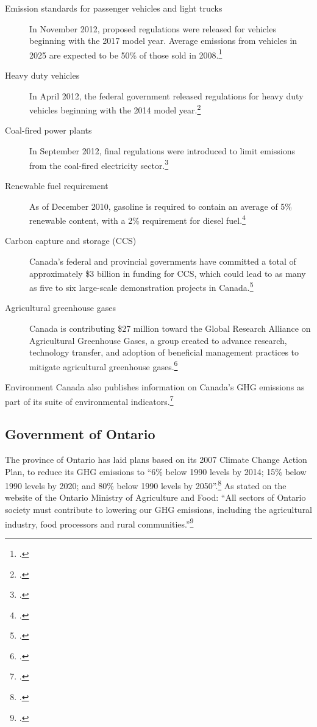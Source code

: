 \begin{description}
	\item[Emission standards for passenger vehicles and light trucks] In November 2012, proposed regulations were released for vehicles beginning with the 2017 model year. 
	Average emissions from vehicles in 2025 are expected to be 50\% of those sold in 2008.\footcite[][]{ECReducing}
	\item[Heavy duty vehicles] In April 2012, the federal government released regulations for heavy duty vehicles beginning with the 2014 model year.\footcite[][]{ECReducing}
	\item[Coal-fired power plants] In September 2012, final regulations were introduced to limit emissions from the coal-fired electricity sector.\footcite[][]{ECCoalFired}
	\item[Renewable fuel requirement] As of December 2010, gasoline is required to contain an average of 5\% renewable content, with a 2\% requirement for diesel fuel.\footcite[][]{ECReducing}
	\item[Carbon capture and storage (CCS)] Canada's federal and provincial governments have committed a total of approximately \$3 billion in funding for CCS, which could lead to as many as five to six large-scale demonstration projects in Canada.\footcite[][]{ECReducing}
	\item[Agricultural greenhouse gases] Canada is contributing \$27 million toward the Global Research Alliance on Agricultural Greenhouse Gases, a group created to advance research, technology transfer, and adoption of beneficial management practices to mitigate agricultural greenhouse gases.\footcite[][]{ECReducing}
\end{description}		
		


Environment Canada also publishes information on Canada's GHG emissions as part of its suite of environmental indicators.\footcite[][]{ECGHGIndicators}


		
		\subsection{Government of Ontario}



The province of Ontario has laid plans based on its 2007 Climate Change Action Plan, to reduce its GHG emissions to ``6\% below 1990 levels by 2014; 15\% below 1990 levels by 2020; and 80\% below 1990 levels by 2050''.\footcite[][p.3]{20082009ActionPlan}
As stated on the website of the Ontario Ministry of Agriculture and Food: ``All sectors of Ontario society must contribute to lowering our GHG emissions, including the agricultural industry, food processors and rural communities.''\footcite[][]{OntarioCCandAg}



